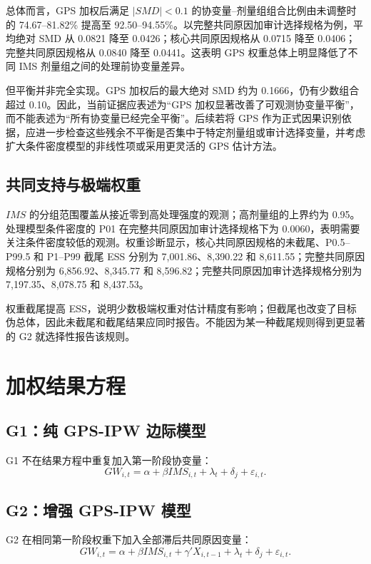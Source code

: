 \documentclass[11pt]{article}
\begin{document}
总体而言，GPS 加权后满足 $|SMD|<0.1$ 的协变量--剂量组组合比例由未调整时的 74.67--81.82\% 提高至 92.50--94.55\%。以完整共同原因加审计选择规格为例，平均绝对 SMD 从 0.0821 降至 0.0426；核心共同原因规格从 0.0715 降至 0.0406；完整共同原因规格从 0.0840 降至 0.0441。这表明 GPS 权重总体上明显降低了不同 IMS 剂量组之间的处理前协变量差异。

但平衡并非完全实现。GPS 加权后的最大绝对 SMD 约为 0.1666，仍有少数组合超过 0.10。因此，当前证据应表述为“GPS 加权显著改善了可观测协变量平衡”，而不能表述为“所有协变量已经完全平衡”。后续若将 GPS 作为正式因果识别依据，应进一步检查这些残余不平衡是否集中于特定剂量组或审计选择变量，并考虑扩大条件密度模型的非线性项或采用更灵活的 GPS 估计方法。

\subsection{共同支持与极端权重}

$IMS$ 的分组范围覆盖从接近零到高处理强度的观测；高剂量组的上界约为 0.95。处理模型条件密度的 P01 在完整共同原因加审计选择规格下为 0.0060，表明需要关注条件密度较低的观测。权重诊断显示，核心共同原因规格的未截尾、P0.5--P99.5 和 P1--P99 截尾 ESS 分别为 7,001.86、8,390.22 和 8,611.55；完整共同原因规格分别为 6,856.92、8,345.77 和 8,596.82；完整共同原因加审计选择规格分别为 7,197.35、8,078.75 和 8,437.53。

权重截尾提高 ESS，说明少数极端权重对估计精度有影响；但截尾也改变了目标伪总体，因此未截尾和截尾结果应同时报告。不能因为某一种截尾规则得到更显著的 G2 就选择性报告该规则。

\section{加权结果方程}

\subsection{G1：纯 GPS-IPW 边际模型}

G1 不在结果方程中重复加入第一阶段协变量：
\[
GW_{i,t}=\alpha+\beta IMS_{i,t}+\lambda_t+\delta_j+\varepsilon_{i,t}.
\]

\subsection{G2：增强 GPS-IPW 模型}

G2 在相同第一阶段权重下加入全部滞后共同原因变量：
\[
GW_{i,t}=\alpha+\beta IMS_{i,t}+\gamma'X_{i,t-1}+\lambda_t+\delta_j+\varepsilon_{i,t}.
\]
\end{document}
